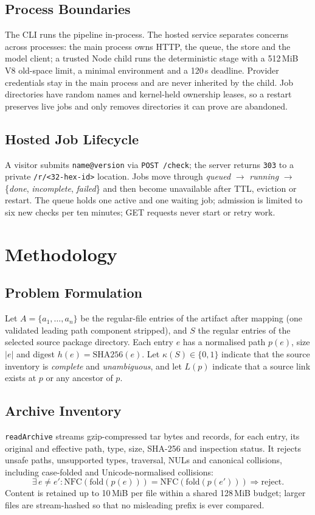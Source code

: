 \documentclass[conference]{IEEEtran}
\newcommand{\code}[1]{\texttt{#1}}
\begin{document}
\subsection{Process Boundaries}
The CLI runs the pipeline in-process. The hosted service separates concerns
across processes: the main process owns HTTP, the queue, the store and the model
client; a trusted Node child runs the deterministic stage with a 512\,MiB V8
old-space limit, a minimal environment and a 120\,s deadline. Provider
credentials stay in the main process and are never inherited by the child. Job
directories have random names and kernel-held ownership leases, so a restart
preserves live jobs and only removes directories it can prove are abandoned.

\subsection{Hosted Job Lifecycle}
A visitor submits \code{name@version} via \code{POST /check}; the server
returns \code{303} to a private \code{/r/<32-hex-id>} location. Jobs move
through \emph{queued} $\to$ \emph{running} $\to$ \{\emph{done},
\emph{incomplete}, \emph{failed}\} and then become unavailable after TTL,
eviction or restart. The queue holds one active and one waiting job; admission
is limited to six new checks per ten minutes; GET requests never start or retry
work.

\section{Methodology}\label{sec:method}

\subsection{Problem Formulation}
Let $A=\{a_1,\dots,a_n\}$ be the regular-file entries of the artifact after
mapping (one validated leading path component stripped), and $S$ the regular
entries of the selected source package directory. Each entry $e$ has a
normalised path $p(e)$, size $|e|$ and digest $h(e)=\mathrm{SHA256}(e)$. Let
$\kappa(S)\in\{0,1\}$ indicate that the source inventory is \emph{complete} and
\emph{unambiguous}, and let $L(p)$ indicate that a source link exists at $p$ or
any ancestor of $p$.

\subsection{Archive Inventory}
\code{readArchive} streams gzip-compressed tar bytes and records, for each
entry, its original and effective path, type, size, SHA-256 and inspection
status. It rejects unsafe paths, unsupported types, traversal, NULs and
canonical collisions, including case-folded and Unicode-normalised collisions:
\begin{equation}
\exists\, e\neq e' : \mathrm{NFC}(\mathrm{fold}(p(e))) = \mathrm{NFC}(\mathrm{fold}(p(e'))) \Rightarrow \text{reject}.
\end{equation}
Content is retained up to 10\,MiB per file within a shared 128\,MiB budget; larger
files are stream-hashed so that no misleading prefix is ever compared.
\end{document}
